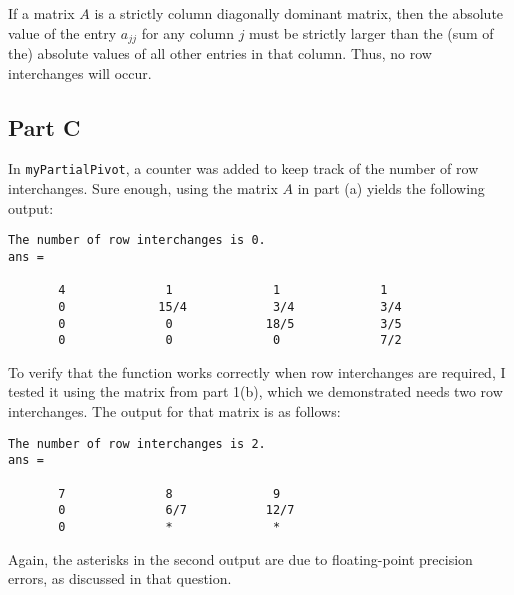 \documentclass[12pt]{article}
\newcommand{\code}[1]{\texttt{#1}}
\begin{document}
If a matrix $A$ is a strictly column diagonally dominant matrix, then the absolute value of the entry $a_{jj}$ for any column $j$ must be strictly larger than the (sum of the) absolute values of all other entries in that column. Thus, no row interchanges will occur.

\subsection*{Part C}

In \code{myPartialPivot}, a counter was added to keep track of the number of row interchanges. Sure enough, using the matrix $A$ in part (a) yields the following output:

\begin{verbatim}
The number of row interchanges is 0.
ans =

       4              1              1              1       
       0             15/4            3/4            3/4     
       0              0             18/5            3/5     
       0              0              0              7/2     
\end{verbatim}

To verify that the function works correctly when row interchanges are required, I tested it using the matrix from part 1(b), which we demonstrated needs two row interchanges. The output for that matrix is as follows:

\begin{verbatim}
The number of row interchanges is 2.
ans =

       7              8              9       
       0              6/7           12/7     
       0              *              *     
\end{verbatim}

Again, the asterisks in the second output are due to floating-point precision errors, as discussed in that question.
\end{document}
